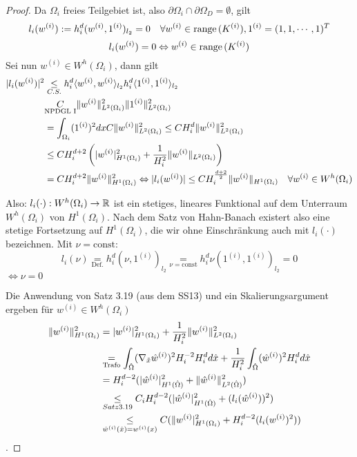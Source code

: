 \begin{proof}
  Da $\Omega_i$ freies Teilgebiet ist, also $\partial\Omega_i \cap \partial\Omega_D = \emptyset$, gilt 
  \[
    l_i(w^{(i)}):=h_i^d(w^{(i)},1^{(i)})_{l_2} = 0 \quad \forall w^{(i)}\in\textnormal{range}\,(K^{(i)}), 1^{(i)}=(1,1,\cdots,1)^T\\
  \]
  \begin{equation}
    l_i(w^{(i)})= 0 \Leftrightarrow w^{(i)}\in\textnormal{range}\,(K^{(i)}) 
    \label{}
  \end{equation}
  Sei nun $w^{(i)}\in W^h(\Omega_i)$, dann gilt
  \begin{align*}
    |l_i(w^{(i)})|^2 &\underset{C.S.}{\leq} h_i^d \langle w^{(i)},w^{(i)}\rangle_{l_2} h_i^d \langle 1^{(i)},1^{(i)}\rangle_{l_2}\\
    &\underset{\text{NPDGL I}} C\|w^{(i)}\|_{L^2(\Omega_i)}^2 \|1^{(i)}\|_{L^2(\Omega_i)}^2\\
    &= \int_{\Omega_i} (1^{(i)})^2 dx C \|w^{(i)}\|_{L^2(\Omega_i)}^2 \leq CH_i^d \|w^{(i)}\|_{L^2(\Omega_i)}^2\\
    &\leq C H_i^{d+2} \left( |w^{(i)}|_{H^1(\Omega_i)}^2 + \frac{1}{H_i^2} \|w^{(i)}\|_{L^2(\Omega_i)} \right)\\
    &= C H_i^{d+2} \|w^{(i)}\|_{H^1(\Omega_i)}^2 \Leftrightarrow |l_i(w^{(i)})| \leq CH_i^{\frac{d+2}{2}} \|w^{(i)}\|_{H^1(\Omega_i)} \quad \forall w^{(i)}\in W^h(\Omega_i)
  \end{align*}

  Also: $l_i(\cdot): W^h(\Omega_i)\to\mathbb{R}$ ist ein stetiges, lineares Funktional auf dem Unterraum $W^h(\Omega_i)$ von $H^1(\Omega_i)$. Nach dem Satz von Hahn-Banach existert also eine stetige Fortsetzung auf $H^1(\Omega_i)$, die wir ohne Einschränkung auch mit $l_i(\cdot)$ bezeichnen. Mit $\nu=\text{const}$: 
  \[
    l_i(\nu)\underset{\text{Def.}}{=} h_i^d(\nu,1^{(i)})_{l_2} \underset{\nu=\text{const}}{=} h_i^d\nu(1^{(i)},1^{(i)})_{l_2} = 0 
  \]
  $\Leftrightarrow \nu=0$

  Die Anwendung von Satz 3.19 (aus dem SS13) und ein Skalierungsargument ergeben für $w^{(i)}\in W^h(\Omega_i)$
  \begin{align*}
    \|w^{(i)}\|_{H^1(\Omega_i)}^2 &= |w^{(i)}|_{H^1(\Omega_i)}^2 + \frac{1}{H_i^2} \|w^{(i)}\|_{L^2(\Omega_i)}^2\\
    &\underset{\text{Trafo}}{=} \int_{\hat{\Omega}} (\nabla_{\tilde{x}}\hat{w}^{(i)})^2 H_i^{-2}H_i^d d\hat{x} + \frac{1}{H_i^2} \int_{\hat{\Omega}}(\hat{w}^{(i)})^2 H_i^d d\hat{x}\\
    &= H_i^{d-2} (|\hat{w}^{(i)}|_{H^1(\hat{\Omega})}^2 + \|\hat{w}^{(i)}\|_{L^2(\hat{\Omega})}^2)\\
    &\underset{Satz 3.19}{\leq} C_iH_i^{d-2} (|{\hat{w}}^{(i)}|_{H^1(\hat{\Omega})}^2 + (l_i(\hat{w}^{(i)}))^2)\\
    &\underset{{\hat{w}}^{(i)}(\hat{x})=w^{(i)}(x)}{\leq} C(\|w^{(i)}|_{H^1(\Omega_i)}^2 + H_i^{d-2}(l_i(w^{(i)})^2))
  \end{align*}.


\end{proof}
